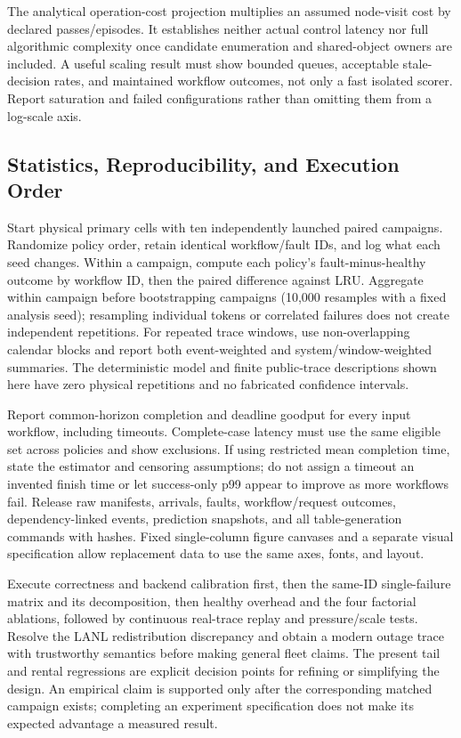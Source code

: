 \documentclass[sigplan,10pt,anonymous,nonacm]{acmart}
\begin{document}
The analytical operation-cost projection multiplies an assumed node-visit cost by declared passes/episodes. It establishes neither actual control latency nor full
algorithmic complexity once candidate enumeration and shared-object
owners are included. A useful scaling result must show bounded queues,
acceptable stale-decision rates, and maintained workflow outcomes, not
only a fast isolated scorer. Report saturation and failed configurations
rather than omitting them from a log-scale axis.

\FloatBarrier
\subsection{Statistics, Reproducibility, and Execution Order}
\label{sec:eval-plan}

Start physical primary cells with ten independently launched paired
campaigns. Randomize policy order, retain identical workflow/fault IDs,
and log what each seed changes. Within a campaign, compute each policy's
fault-minus-healthy outcome by workflow ID, then the paired difference
against LRU. Aggregate within campaign before bootstrapping campaigns
(10,000 resamples with a fixed analysis seed); resampling individual
tokens or correlated failures does not create independent repetitions.
For repeated trace windows, use non-overlapping calendar blocks and
report both event-weighted and system/window-weighted summaries.
The deterministic model and finite public-trace descriptions shown here
have zero physical repetitions and no fabricated confidence intervals.

Report common-horizon completion and deadline goodput for every input
workflow, including timeouts. Complete-case latency must use the same
eligible set across policies and show exclusions. If using restricted
mean completion time, state the estimator and censoring assumptions;
do not assign a timeout an invented finish time or let success-only
p99 appear to improve as more workflows fail. Release raw manifests,
arrivals, faults, workflow/request outcomes, dependency-linked events,
prediction snapshots, and all table-generation commands with hashes.
Fixed single-column figure canvases and a separate visual specification
allow replacement data to use the same axes, fonts, and layout.

Execute correctness and backend calibration first, then the same-ID
single-failure matrix and its decomposition, then healthy overhead and
the four factorial ablations, followed by continuous real-trace replay
and pressure/scale tests. Resolve the LANL redistribution discrepancy
and obtain a modern outage trace with trustworthy semantics before
making general fleet claims. The present tail and rental regressions
are explicit decision points for refining or simplifying the design.
An empirical claim is supported only after the corresponding matched
campaign exists; completing an experiment specification does not make
its expected advantage a measured result.
\end{document}
